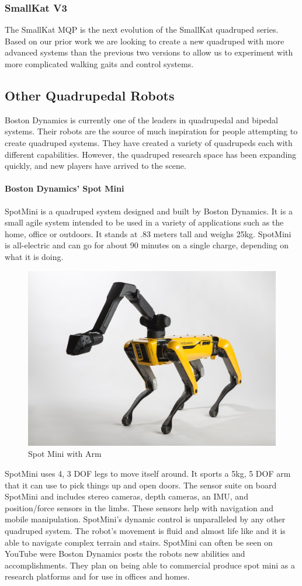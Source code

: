         \subsubsection{SmallKat V3}
        The SmallKat MQP is the next evolution of the SmallKat quadruped series. Based on our prior work we are looking to create a new quadruped with more advanced systems than the previous two versions to allow  us to experiment with more complicated walking gaits and control systems.

    \subsection{Other Quadrupedal Robots}
    Boston Dynamics is currently one of the leaders in quadrupedal and bipedal systems. Their robots are the source of much inspiration for people attempting to create quadruped systems. They have created a variety of quadrupeds each with different capabilities. However, the quadruped research space has been expanding quickly, and new players have arrived to the scene.
    \paragraph{Boston Dynamics’ Spot Mini}
    SpotMini is a quadruped system designed and built by Boston Dynamics. It is a small agile system intended to be used in a variety of applications such as the home, office or outdoors. It stands at .83 meters tall and weighs 25kg. SpotMini is all-electric and can go for about 90 minutes on a single charge, depending on what it is doing.
    \begin{figure}[H]
        \centering
        \includegraphics[width=0.7\linewidth]{figures/SpotMiniwithArm.jpg}
        \caption{Spot Mini with Arm}
        \label{fig:SpotMiniWithArm}
    \end{figure}
    SpotMini uses 4, 3 DOF legs to move itself around. It sports a 5kg, 5 DOF arm that it can use to pick things up and open doors. The sensor suite on board SpotMini and includes stereo cameras, depth cameras, an IMU, and position/force sensors in the limbs. These sensors help with navigation and mobile manipulation. SpotMini's dynamic control is unparalleled by any other quadruped system. The robot's movement is fluid and almost life like and it is able to navigate complex terrain and stairs. SpotMini can often be seen on YouTube were Boston Dynamics posts the robots new abilities and accomplishments. They plan on being able to commercial produce spot mini as a research platforms and for use in offices and homes.
    
